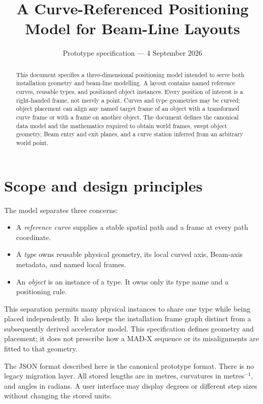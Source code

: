 \documentclass[11pt,a4paper]{article}
\title{A Curve-Referenced Positioning Model for Beam-Line Layouts}
\author{}
\date{Prototype specification --- 4 September 2026}
\begin{document}
\maketitle

\begin{abstract}
This document specifies a three-dimensional positioning model intended to serve
both installation geometry and beam-line modelling.  A layout contains named
reference curves, reusable types, and positioned object instances.  Every
position of interest is a right-handed frame, not merely a point.  Curves and
type geometries may be curved; object placement can align any named target frame
of an object with a transformed curve frame or with a frame on another object.
The document defines the canonical data model and the mathematics required to
obtain world frames, swept object geometry, Beam entry and exit planes, and a
curve station inferred from an arbitrary world point.
\end{abstract}

\tableofcontents

\section{Scope and design principles}

The model separates three concerns:

\begin{itemize}
  \item A \emph{reference curve} supplies a stable spatial path and a frame at
        every path coordinate.
  \item A \emph{type} owns reusable physical geometry, its local curved axis,
        Beam-axis metadata, and named local frames.
  \item An \emph{object} is an instance of a type.  It owns only its type name
        and a positioning rule.
\end{itemize}

This separation permits many physical instances to share one type while being
placed independently.  It also keeps the installation frame graph distinct
from a subsequently derived accelerator model.  This specification defines
geometry and placement; it does not prescribe how a MAD-X sequence or its
misalignments are fitted to that geometry.

The JSON format described here is the canonical prototype format.  There is no
legacy migration layer.  All stored lengths are in metres, curvatures in
metres$^{-1}$, and angles in radians.  A user interface may display degrees or
different step sizes without changing the stored units.
\end{document}
